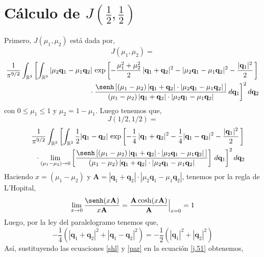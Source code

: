 \documentclass[12pt]{book}
\numberwithin{equation}{chapter}
\def\v{\mathbf}
\def\q{\mathbf{q}}
\def\R{\mathbb{R}}
\begin{document}

\chapter{C\'alculo de $J \left(\frac{1}{2},\frac{1}{2} \right)$}
Primero, $J\left(\mu_{1},\mu_{2} \right)$ est\'a dada por,
$$J(\mu_{1},\mu_{2})= $$
\begin{align}\label{J0}
\frac{1}{\pi^{9/2}} \int_{\R^{3}} \left[ \int_{\R^{3}} 
|\mu_{2}\q_{1}-\mu_{1}\q_{2}|\, \exp \left[ -\frac{\mu_{1}^{2}+\mu_{2}^{2}}{2}\, |\q_{1}+\q_{2}|^{2} - |\mu_{2}\q_{1}-\mu_{1}\q_{2}|^{2}-\frac{|\q_{1}|^{2}}{2}\, \right]      
\right.
\nonumber\\
\qquad \left. \vphantom{\int_{\R^{2}}}
\cdot \frac{ \senh \left[ (\mu_{1}-\mu_{2})\, |\q_{1}+\q_{2}|\cdot |\mu_{2}\q_{1}-\mu_{1}\q_{2}| \, \right]}{ (\mu_{1}-\mu_{2})\, |\q_{1}+\q_{2}|\cdot |\mu_{2}\q_{1}-\mu_{1}\q_{2}| }
\,d\q_{1} \right]^{2} d\q_{2}
\end{align}
con $0 \leq \mu_{1} \leq 1$ y $\mu_{2}= 1-\mu_{1}$. Luego tenemos que,
$$ J\left(1/2,1/2 \right)=  $$
\begin{align}\label{j.51}
\frac{1}{\pi^{9/2}} \int_{\R^{3}} \left[ \int_{\R^{3}} 
\frac{1}{2}|\q_{1}-\q_{2}|\, \exp \left[ -\frac{1}{4} \,|\q_{1}+\q_{2}|^{2} -\frac{1}{4} |\q_{1}-\q_{2}|^{2}-\frac{|\q_{1}|^{2}}{2}\, \right]      
\right.
\nonumber\\
\qquad \left. \vphantom{\int_{\R^{2}}}
\cdot \lim_{(\mu_{1}-\mu_{2})\rightarrow 0} \left[ \frac{ \senh \left[ (\mu_{1}-\mu_{2})\, |\q_{1}+\q_{2}|\cdot |\mu_{2}\q_{1}-\mu_{1}\q_{2}| \, \right]}{ (\mu_{1}-\mu_{2})\, |\q_{1}+\q_{2}|\cdot |\mu_{2}\q_{1}-\mu_{1}\q_{2}| }  \right]
\,d\q_{1} \right]^{2} d\q_{2}
\end{align}
Haciendo $x=( \mu_{1}-\mu_{2} )$ y $\v{A} =|\q_{1}+\q_{2}|\cdot |\mu_{2}\q_{1}-\mu_{1}\q_{2}| $, tenemos por la regla de L'Hopital,
\begin{equation}\label{shl}
\lim_{x \rightarrow 0} \frac{\senh(x \v{A})}{x \v{A}}= \frac{\v{A} \cosh(x \v{A})}{\v{A}} \Big|_{x=0}=1
\end{equation}
Luego, por la ley del paralelogramo tenemos que,
\begin{equation}\label{par}
-\frac{1}{4} \left( |\q_{1} + \q_{2}|^{2} + |\q_{1} - \q_{2}|^{2} \right)= -\frac{1}{2} \left(|\q_{1}|^{2} + |\q_{2}|^{2}  \right)
\end{equation}
As\'i, sustituyendo las ecuaciones \eqref{shl} y \eqref{par} en la ecuaci\'on \eqref{j.51} obtenemos,
\end{document}

